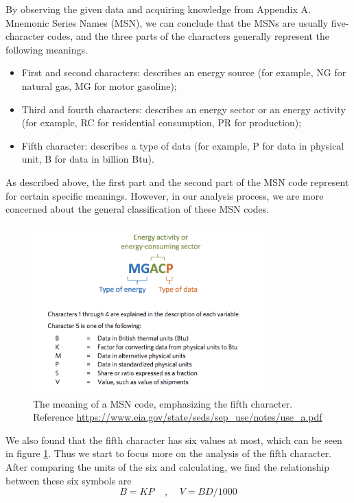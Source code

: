 \documentclass[a4paper,11pt]{article}
\begin{document}
\par By observing the given data and acquiring knowledge from Appendix A. Mnemonic Series Names (MSN)\cite{3}, we can conclude that the MSNs are usually five-character codes, and the three parts of the characters generally represent the following meanings.

\begin{itemize}
    \item First and second characters: describes an energy source (for example, NG for natural gas, MG for motor gasoline);
    \item Third and fourth characters: describes an energy sector or an energy activity (for example, RC for residential consumption, PR for production);
    \item Fifth character: describes a type of data (for example, P for data in physical unit, B for data in billion Btu).    \cite{3}
\end{itemize}

\par As described above, the first part and the second part of the MSN code represent for certain specific meanings. However, in our analysis process, we are more concerned about the general classification of these MSN codes. 

\begin{figure}[h]%
    \centering 
    \includegraphics[width=0.8\textwidth]{./Pic/msn_5.png}
    \caption{The meaning of a MSN code, emphasizing the fifth character. Reference \url{https://www.eia.gov/state/seds/sep_use/notes/use_a.pdf}}
    \label{fig:msn_5}  
\end{figure}
\par We also found that the fifth character has six values at most, which can be seen in figure \ref{fig:msn_5}. Thus we start to focus more on the analysis of the fifth character. After comparing the units of the six and calculating, we find the relationship between these six symbols are
\begin{equation}
    B=KP~~~~~,~~~~~V=BD / 1000
\end{equation}
\end{document}
